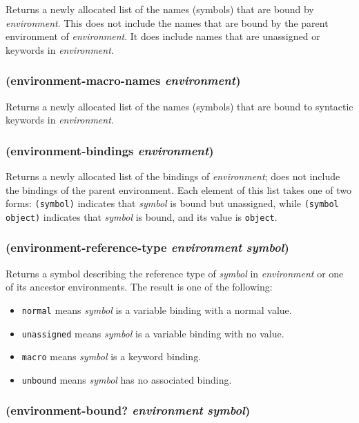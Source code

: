 \documentclass{article}
\begin{document}
Returns a newly allocated list of the names (symbols) that are bound by \emph{environment}.
This does not include the names that are bound by the parent environment of
\emph{environment}. It does include names that are unassigned or keywords in
\emph{environment}.

\subsubsection{(environment-macro-names \emph{environment})}

Returns a newly allocated list of the names (symbols) that are bound to syntactic keywords in
\emph{environment}.

\subsubsection{(environment-bindings \emph{environment})}

Returns a newly allocated list of the bindings of \emph{environment}; does not
include the bindings of the parent environment. Each element of this list takes
one of two forms: \verb|(symbol)| indicates that \emph{symbol} is bound but unassigned,
while \verb|(symbol object)| indicates that \emph{symbol} is bound, and its value is
\verb|object|.

\subsubsection{(environment-reference-type \emph{environment} \emph{symbol})}

Returns a symbol describing the reference type of \emph{symbol} in \emph{environment} or one
of its ancestor environments. The result is one of the following:

\begin{itemize}
\item \verb|normal| means \emph{symbol} is a variable binding with a normal value.
\item \verb|unassigned| means \emph{symbol} is a variable binding with no value.
\item \verb|macro| means \emph{symbol} is a keyword binding.
\item \verb|unbound| means \emph{symbol} has no associated binding.
\end{itemize}

\subsubsection{(environment-bound? \emph{environment} \emph{symbol})}
\end{document}
